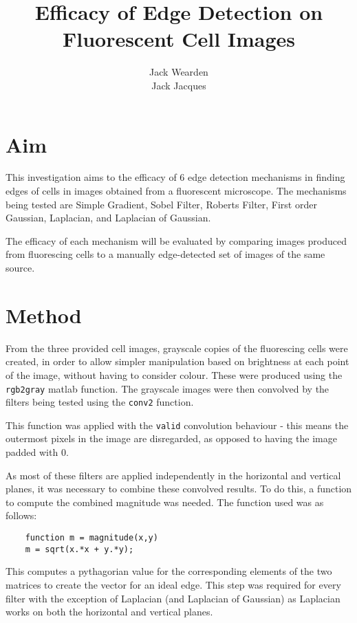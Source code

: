 \documentclass[12pt]{article}
\title{Efficacy of Edge Detection on Fluorescent Cell Images}
\date{}
\author{Jack Wearden\\Jack Jacques}
\begin{document}
  \maketitle
  \section{Aim}

  This investigation aims to the efficacy of 6 edge detection mechanisms in finding edges of cells in images obtained from a fluorescent microscope. The mechanisms being tested are Simple Gradient, Sobel Filter, Roberts Filter, First order Gaussian, Laplacian, and Laplacian of Gaussian.

  The efficacy of each mechanism will be evaluated by comparing images produced from fluorescing cells to a manually edge-detected set of images of the same source.

  \section{Method}

  From the three provided cell images, grayscale copies of the fluorescing cells were created, in order to allow simpler manipulation based on brightness at each point of the image, without having to consider colour. These were produced using the \texttt{rgb2gray} matlab function. The grayscale images were then convolved by the filters being tested using the \texttt{conv2} function.

  This function was applied with the \texttt{valid} convolution behaviour - this means the outermost pixels in the image are disregarded, as opposed to having the image padded with 0.

  As most of these filters are applied independently in the horizontal and vertical planes, it was necessary to combine these convolved results. To do this, a function to compute the combined magnitude was needed. The function used was as follows:

  \begin{verbatim}
    function m = magnitude(x,y)
    m = sqrt(x.*x + y.*y);
  \end{verbatim}

  This computes a pythagorian value for the corresponding elements of the two matrices to create the vector for an ideal edge. This step was required for every filter with the exception of Laplacian (and Laplacian of Gaussian) as Laplacian works on both the horizontal and vertical planes.
\end{document}
